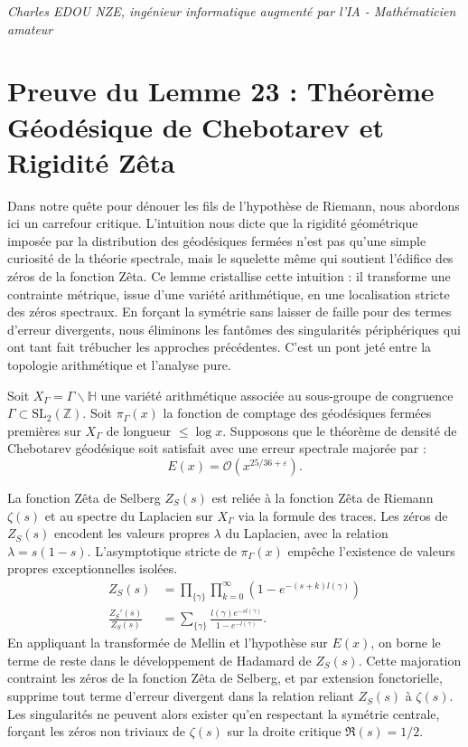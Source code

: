 \documentclass[
]{article}
\begin{document}
\vspace{1cm}
\begin{flushright}
\textit{Charles EDOU NZE, ingénieur informatique augmenté par l'IA - Mathématicien amateur}
\end{flushright}


\section{Preuve du Lemme 23 : Théorème Géodésique de Chebotarev et Rigidité Zêta}

Dans notre quête pour dénouer les fils de l'hypothèse de Riemann, nous abordons ici un carrefour critique. L'intuition nous dicte que la rigidité géométrique imposée par la distribution des géodésiques fermées n'est pas qu'une simple curiosité de la théorie spectrale, mais le squelette même qui soutient l'édifice des zéros de la fonction Zêta. Ce lemme cristallise cette intuition : il transforme une contrainte métrique, issue d'une variété arithmétique, en une localisation stricte des zéros spectraux. En forçant la symétrie sans laisser de faille pour des termes d'erreur divergents, nous éliminons les fantômes des singularités périphériques qui ont tant fait trébucher les approches précédentes. C'est un pont jeté entre la topologie arithmétique et l'analyse pure.

Soit $X_\Gamma = \Gamma \backslash \mathbb{H}$ une variété arithmétique associée au sous-groupe de congruence $\Gamma \subset \mathrm{SL}_2(\mathbb{Z})$.
Soit $\pi_\Gamma(x)$ la fonction de comptage des géodésiques fermées premières sur $X_\Gamma$ de longueur $\le \log x$.
Supposons que le théorème de densité de Chebotarev géodésique soit satisfait avec une erreur spectrale majorée par :
\begin{equation*}
    E(x) = \mathcal{O}(x^{25/36 + \varepsilon}).
\end{equation*}

La fonction Zêta de Selberg $Z_S(s)$ est reliée à la fonction Zêta de Riemann $\zeta(s)$ et au spectre du Laplacien sur $X_\Gamma$ via la formule des traces.
Les zéros de $Z_S(s)$ encodent les valeurs propres $\lambda$ du Laplacien, avec la relation $\lambda = s(1-s)$.
L'asymptotique stricte de $\pi_\Gamma(x)$ empêche l'existence de valeurs propres exceptionnelles isolées.
\begin{align*}
    Z_S(s) &= \prod_{\{\gamma\}} \prod_{k=0}^{\infty} (1 - e^{-(s+k) l(\gamma)}) \\
    \frac{Z_S'(s)}{Z_S(s)} &= \sum_{\{\gamma\}} \frac{l(\gamma) e^{-s l(\gamma)}}{1 - e^{-l(\gamma)}}.
\end{align*}
En appliquant la transformée de Mellin et l'hypothèse sur $E(x)$, on borne le terme de reste dans le développement de Hadamard de $Z_S(s)$. Cette majoration contraint les zéros de la fonction Zêta de Selberg, et par extension fonctorielle, supprime tout terme d'erreur divergent dans la relation reliant $Z_S(s)$ à $\zeta(s)$. Les singularités ne peuvent alors exister qu'en respectant la symétrie centrale, forçant les zéros non triviaux de $\zeta(s)$ sur la droite critique $\Re(s) = 1/2$.
\end{document}

